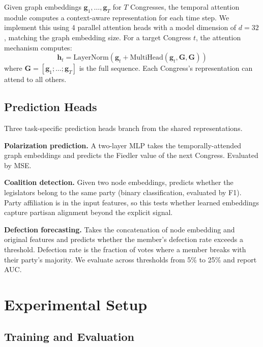 \documentclass[12pt, a4paper]{article}
\begin{document}
Given graph embeddings $\mathbf{g}_1, \ldots, \mathbf{g}_T$ for $T$ Congresses, the temporal attention module computes a context-aware representation for each time step. We implement this using 4 parallel attention heads with a model dimension of $d=32$, matching the graph embedding size. For a target Congress $t$, the attention mechanism computes:
\begin{equation}
    \mathbf{h}_t = \text{LayerNorm}\left(\mathbf{g}_t + \text{MultiHead}(\mathbf{g}_t, \mathbf{G}, \mathbf{G})\right)
\end{equation}
where $\mathbf{G} = [\mathbf{g}_1; \ldots; \mathbf{g}_T]$ is the full sequence. Each Congress's representation can attend to all others.

\subsection{Prediction Heads}

Three task-specific prediction heads branch from the shared representations.

\textbf{Polarization prediction.} A two-layer MLP takes the temporally-attended graph embeddings and predicts the Fiedler value of the next Congress. Evaluated by MSE.

\textbf{Coalition detection.} Given two node embeddings, predicts whether the legislators belong to the same party (binary classification, evaluated by F1). Party affiliation is in the input features, so this tests whether learned embeddings capture partisan alignment beyond the explicit signal.

\textbf{Defection forecasting.} Takes the concatenation of node embedding and original features and predicts whether the member's defection rate exceeds a threshold. Defection rate is the fraction of votes where a member breaks with their party's majority. We evaluate across thresholds from 5\% to 25\% and report AUC.

\section{Experimental Setup}

\subsection{Training and Evaluation}
\end{document}
